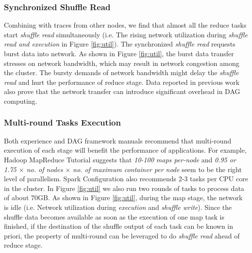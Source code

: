 \subsubsection{Synchronized Shuffle Read}
Combining with traces from other nodes, we find that almost all the reduce tasks start \textit{shuffle read} simultaneously (i.e. The rising network utilization during \textit{shuffle read and execution} in Figure \ref{fig:util}). The synchronized \textit{shuffle read} requests burst data into network. As shown in Figure \ref{fig:util}, the burst data transfer stresses on network bandwidth, which may result in network congestion among the cluster. The  bursty demands of network bandwidth might delay the \textit{shuffle read} and hurt the performance of reduce stage. Data reported in previous work\cite{coflow, managing} also prove that the network transfer can introduce significant overhead in DAG computing.

\subsubsection{Multi-round Tasks Execution}\label{multi}
Both experience and DAG framework manuals recommend that multi-round execution of each stage will benefit the performance of applications.
For example, Hadoop MapReduce Tutorial \cite{hadooptutorial} suggests that \textit{10-100 maps per-node} and \textit{0.95 or 1.75 $\times$ no. of nodes $\times$ no. of maximum container per node} seem to be the right level of parallelism. Spark Configuration also recommends 2-3 tasks per CPU core in the cluster\cite{sparkconf}.
In Figure \ref{fig:util} we also run two rounds of tasks to process data of about $70$GB. As shown in Figure \ref{fig:util}, during the map stage, the network is idle (i.e. Network utilization during \textit{execution} and \textit{shuffle write}). Since the shuffle data becomes available as soon as the execution of one map task is finished, if the destination of the shuffle output of each task can be known in priori, the property of multi-round can be leveraged to do \textit{shuffle read} ahead of reduce stage.


